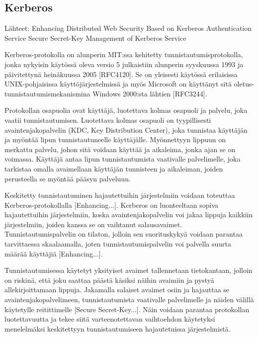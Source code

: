 \subsection{Kerberos}

Lähteet: 
Enhancing Distributed Web Security Based on Kerberos Authentication Service
Secure Secret-Key Management of Kerberos Service

Kerberos-protokolla on alunperin MIT:ssa kehitetty tunnistautumisprotokolla, jonka nykyisin käytössä oleva versio 5 julkaistiin alunperin syyskuussa 1993 ja päivitettynä heinäkuussa 2005 [RFC4120]. Se on yleisesti käytössä erilaisissa UNIX-pohjaisissa käyttöjärjestelmissä ja myös Microsoft on käyttänyt sitä oletus-tunnistautumismekanismina Windows 2000:sta lähtien [RFC3244].

Protokollan osapuolia ovat käyttäjä, luotettava kolmas osapuoli ja palvelu, joka vaatii tunnistautumisen. Luotettava kolmas osapuoli on tyypillisesti avaintenjakopalvelin (KDC, Key Distribution Center), joka tunnistaa käyttäjän ja myöntää lipun tunnistautuneelle käyttäjälle. Myönnettyyn lippuun on merkattu palvelu, johon sitä voidaan käyttää ja aikaleima, jonka ajan se on voimassa. Käyttäjä antaa lipun tunnistautumista vaativalle palvelimelle, joka tarkistaa omalla avaimellaan käyttäjän tunnisteen ja aikaleiman, joiden perusteella se myöntää pääsyn palveluun.

Keskitetty tunnistautuminen hajautettuihin järjestelmiin voidaan toteuttaa Kerberos-protokollalla [Enhancing...]. Kerberos on luonteeltaan sopiva hajautettuihin järjestelmiin, koska avaintenjakopalvelin voi jakaa lippuja kaikkiin järjestelmiin, joiden kanssa se on vaihtanut salausavaimet. Tunnistautumispalvelin on tilaton, jolloin sen suorituskykyä voidaan parantaa tarvittaessa skaalaamalla, joten tunnistautumispalvelin voi palvella suurta määrää käyttäjiä [Enhancing...]. 

Tunnistautumisessa käytetyt yksityiset avaimet tallennetaan tietokantaan, jolloin on riskinä, että joku saattaa päästä käsiksi näihin avaimiin ja pystyä allekirjoittamaan lippuja. Jakamalla salaiset avaimet osiin ja hajauttaa se avaintenjakopalvelimeen, tunnistautumista vaativalle palvelimelle ja näiden välillä käytetylle reitittimelle [Secure Secret-Key...]. Näin voidaan parantaa protokollan luotettavuutta ja tekee siitä varteenotettavan vaihtoehdon käytetyksi menelelmäksi keskitettyyn tunnistautumiseen hajautetuissa järjestelmistä.
